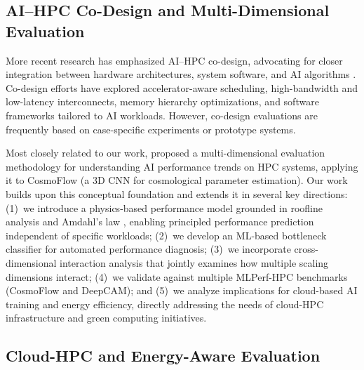 \documentclass{llncs}
\begin{document}
\subsection{AI--HPC Co-Design and Multi-Dimensional Evaluation}

More recent research has emphasized AI--HPC co-design, advocating for closer integration between hardware architectures, system software, and AI algorithms \cite{Dongarra2020}. Co-design efforts have explored accelerator-aware scheduling, high-bandwidth and low-latency interconnects, memory hierarchy optimizations, and software frameworks tailored to AI workloads. However, co-design evaluations are frequently based on case-specific experiments or prototype systems.

Most closely related to our work, \cite{Wang2024SAIH} proposed a multi-dimensional evaluation methodology for understanding AI performance trends on HPC systems, applying it to CosmoFlow (a 3D CNN for cosmological parameter estimation). Our work builds upon this conceptual foundation and extends it in several key directions: (1)~we introduce a physics-based performance model grounded in roofline analysis \cite{Williams2009Roofline} and Amdahl's law \cite{Amdahl1967}, enabling principled performance prediction independent of specific workloads; (2)~we develop an ML-based bottleneck classifier for automated performance diagnosis; (3)~we incorporate cross-dimensional interaction analysis that jointly examines how multiple scaling dimensions interact; (4)~we validate against multiple MLPerf-HPC benchmarks (CosmoFlow and DeepCAM); and (5)~we analyze implications for cloud-based AI training and energy efficiency, directly addressing the needs of cloud-HPC infrastructure and green computing initiatives.

\subsection{Cloud-HPC and Energy-Aware Evaluation}
\end{document}
